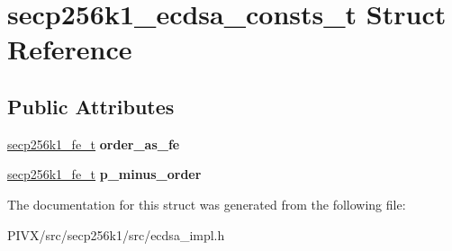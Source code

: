 \hypertarget{structsecp256k1__ecdsa__consts__t}{}\section{secp256k1\+\_\+ecdsa\+\_\+consts\+\_\+t Struct Reference}
\label{structsecp256k1__ecdsa__consts__t}
\subsection*{Public Attributes}
\begin{DoxyCompactItemize}
\item 
\mbox{\label{structsecp256k1__ecdsa__consts__t_a13ce93866b2616ef7725cccdbc2b6d40}} 
\mbox{\hyperlink{structsecp256k1__fe__t}{secp256k1\+\_\+fe\+\_\+t}} {\bfseries order\+\_\+as\+\_\+fe}
\item 
\mbox{\label{structsecp256k1__ecdsa__consts__t_a0d55a081630828f7b904a7db3c2e112a}} 
\mbox{\hyperlink{structsecp256k1__fe__t}{secp256k1\+\_\+fe\+\_\+t}} {\bfseries p\+\_\+minus\+\_\+order}
\end{DoxyCompactItemize}


The documentation for this struct was generated from the following file\+:\begin{DoxyCompactItemize}
\item 
P\+I\+V\+X/src/secp256k1/src/ecdsa\+\_\+impl.\+h\end{DoxyCompactItemize}
